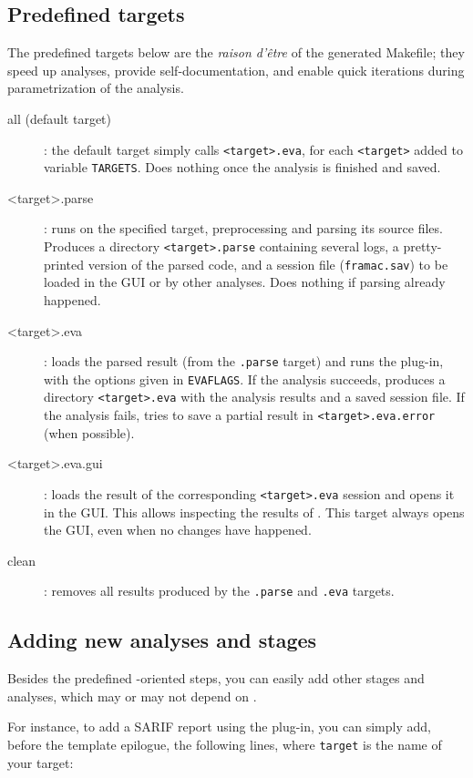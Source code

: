 \subsection{Predefined targets}

The predefined targets below are the {\em raison d'être} of the generated
Makefile; they speed up analyses, provide self-documentation, and enable
quick iterations during parametrization of the analysis.

\begin{description}
\item[all (default target)]: the default target simply calls
  \texttt{<target>.eva}, for each \texttt{<target>} added to variable
  \texttt{TARGETS}. Does nothing once the analysis is finished and saved.
\item[<target>.parse]: runs \FramaC on the specified target, preprocessing
  and parsing its source files. Produces a directory \texttt{<target>.parse}
  containing several logs, a pretty-printed version of the parsed code, and
  a \FramaC session file (\texttt{framac.sav}) to be loaded in the GUI or by
  other analyses. Does nothing if parsing already happened.
\item[<target>.eva]: loads the parsed result (from the \texttt{.parse} target)
  and runs the \Value plug-in, with the options given in \texttt{EVAFLAGS}.
  If the analysis succeeds, produces a directory \texttt{<target>.eva} with the
  analysis results and a saved session file.
  If the analysis fails, tries to save a partial result in
  \texttt{<target>.eva.error} (when possible).
\item[<target>.eva.gui]: loads the result of the corresponding
  \texttt{<target>.eva} session and opens it in the GUI. This allows inspecting
  the results of \Value. This target always opens the GUI, even when no
  changes have happened.
\item[clean]: removes all results produced by the \texttt{.parse} and
  \texttt{.eva} targets.
\end{description}

\subsection{Adding new analyses and stages}

Besides the predefined \Value-oriented steps, you can easily add other stages
and analyses, which may or may not depend on \Value.

For instance, to add a SARIF report using the  plug-in,
you can simply add, before the template epilogue, the following lines, where
\texttt{target} is the name of your target:

